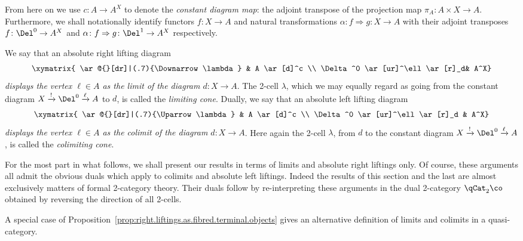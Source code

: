 \begin{ntn}
  From here on  we use $c\colon A\to A^X$ to denote the {\em constant diagram map}: the adjoint transpose of the projection map $\pi_A\colon A\times X\to A$. Furthermore, we shall notationally identify functors $f\colon X\to A$ and natural transformations $\alpha\colon f\Rightarrow g\colon X\to A$ with their adjoint transposes $f\colon\Del^0\to A^X$ and $\alpha\colon f\Rightarrow g\colon \Del^1\to A^X$ respectively.
\end{ntn}

\begin{defn}\label{defn:limit} We say that an absolute right lifting diagram 
    \begin{equation}\label{eq:genericlimit}
      \xymatrix{ \ar@{}[dr]|(.7){\Downarrow\lambda} & A \ar[d]^c \\ \Delta^0 \ar[ur]^\ell \ar[r]_d& A^X}
    \end{equation}
    {\em displays the vertex $\ell\in A$ as the limit of the diagram $d\colon X\to A$}. The 2-cell $\lambda$, which we may equally regard as going from the constant diagram  $X \xrightarrow{!} \Del^0 \xrightarrow{\ell} A$ to $d$, is called the \emph{limiting cone}. Dually, we say that an absolute left lifting diagram 
  \begin{equation}\label{eq:genericcolimit} 
    \xymatrix{ \ar@{}[dr]|(.7){\Uparrow\lambda} & A \ar[d]^c \\ \Delta^0 \ar[ur]^\ell \ar[r]_d & A^X}
  \end{equation} 
  {\em displays the vertex $\ell\in A$ as the colimit of the diagram $d\colon X\to A$}.  Here again the 2-cell $\lambda$, from $d$  to the constant diagram $X \xrightarrow{!} \Del^0 \xrightarrow{\ell} A$, is called the \emph{colimiting cone}.
\end{defn}

\begin{rmk}
For the most part in what follows, we shall present our results in terms of limits and absolute right liftings only. Of course, these arguments all admit the obvious duals which apply to colimits and absolute left liftings. Indeed the results of this section and the last are almost exclusively matters of formal 2-category theory. Their duals follow by re-interpreting these arguments in the dual 2-category $\qCat_2\co$ obtained by reversing the direction of all 2-cells.
\end{rmk}

A special case of Proposition~\ref{prop:right.liftings.as.fibred.terminal.objects} gives an alternative definition of limits and colimits in a quasi-category.

